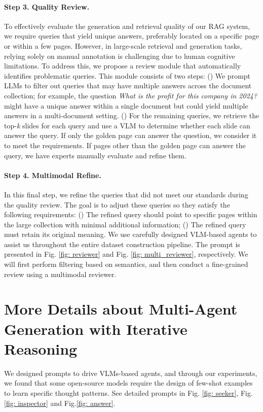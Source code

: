 \paragraph{Step 3. Quality Review.}
To effectively evaluate the generation and retrieval quality of our RAG system, we require queries that yield unique answers, preferably located on a specific page or within a few pages. However, in large-scale retrieval and generation tasks, relying solely on manual annotation is challenging due to human cognitive limitations. To address this, we propose a review module that automatically identifies problematic queries. This module consists of two steps: () We prompt LLMs to filter out queries that may have multiple answers across the document collection; for example, the question \emph{What is the profit for this company in 2024?} might have a unique answer within a single document but could yield multiple answers in a multi-document setting. () For the remaining queries, we retrieve the top-\emph{k} slides for each query and use a VLM to determine whether each slide can answer the query. If only the golden page can answer the question, we consider it to meet the requirements. If pages other than the golden page can answer the query, we have experts manually evaluate and refine them.

\paragraph{Step 4. Multimodal Refine.}
In this final step, we refine the queries that did not meet our standards during the quality review. The goal is to adjust these queries so they satisfy the following requirements: () The refined query should point to specific pages within the large collection with minimal additional information; () The refined query must retain its original meaning. 
We use carefully designed VLM-based agents to assist us throughout the entire dataset construction pipeline. The prompt is presented in Fig. \ref{fig: reviewer} and Fig. \ref{fig: multi_reviewer}, respectively. We will first perform filtering based on semantics, and then conduct a fine-grained review using a multimodal reviewer.



\section{More Details about Multi-Agent Generation with Iterative Reasoning}
\label{appendix: gen}
We designed prompts to drive VLMs-based agents, and through our experiments, we found that some open-source models require the design of few-shot examples to learn specific thought patterns. See detailed prompts in Fig. \ref{fig: seeker}, Fig.\ref{fig: inspector} and Fig.\ref{fig: answer}.






